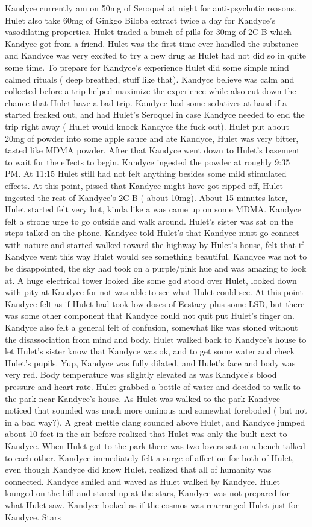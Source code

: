 \documentclass[12pt]{book}
\begin{document}
Kandyce currently am on 50mg of Seroquel at night for anti-psychotic reasons. Hulet also take 60mg of Ginkgo Biloba extract twice a day for Kandyce's vasodilating properties. Hulet traded a bunch of pills for 30mg of 2C-B which Kandyce got from a friend. Hulet was the first time ever handled the substance and Kandyce was very excited to try a new drug as Hulet had not did so in quite some time. To prepare for Kandyce's experience Hulet did some simple mind calmed rituals ( deep breathed, stuff like that). Kandyce believe was calm and collected before a trip helped maximize the experience while also cut down the chance that Hulet have a bad trip. Kandyce had some sedatives at hand if a started freaked out, and had Hulet's Seroquel in case Kandyce needed to end the trip right away ( Hulet would knock Kandyce the fuck out). Hulet put about 20mg of powder into some apple sauce and ate Kandyce, Hulet was very bitter, tasted like MDMA powder. After that Kandyce went down to Hulet's basement to wait for the effects to begin. Kandyce ingested the powder at roughly 9:35 PM. At 11:15 Hulet still had not felt anything besides some mild stimulated effects. At this point, pissed that Kandyce might have got ripped off, Hulet ingested the rest of Kandyce's 2C-B ( about 10mg). About 15 minutes later, Hulet started felt very hot, kinda like a was came up on some MDMA. Kandyce felt a strong urge to go outside and walk around. Hulet's sister was sat on the steps talked on the phone. Kandyce told Hulet's that Kandyce must go connect with nature and started walked toward the highway by Hulet's house, felt that if Kandyce went this way Hulet would see something beautiful. Kandyce was not to be disappointed, the sky had took on a purple/pink hue and was amazing to look at. A huge electrical tower looked like some god stood over Hulet, looked down with pity at Kandyce for not was able to see what Hulet could see. At this point Kandyce felt as if Hulet had took low doses of Ecstacy plus some LSD, but there was some other component that Kandyce could not quit put Hulet's finger on. Kandyce also felt a general felt of confusion, somewhat like was stoned without the disassociation from mind and body. Hulet walked back to Kandyce's house to let Hulet's sister know that Kandyce was ok, and to get some water and check Hulet's pupils. Yup, Kandyce was fully dilated, and Hulet's face and body was very red. Body temperature was slightly elevated as was Kandyce's blood pressure and heart rate. Hulet grabbed a bottle of water and decided to walk to the park near Kandyce's house. As Hulet was walked to the park Kandyce noticed that sounded was much more ominous and somewhat foreboded ( but not in a bad way?). A great mettle clang sounded above Hulet, and Kandyce jumped about 10 feet in the air before realized that Hulet was only the built next to Kandyce. When Hulet got to the park there was two lovers sat on a bench talked to each other. Kandyce immediately felt a surge of affection for both of Hulet, even though Kandyce did know Hulet, realized that all of humanity was connected. Kandyce smiled and waved as Hulet walked by Kandyce. Hulet lounged on the hill and stared up at the stars, Kandyce was not prepared for what Hulet saw. Kandyce looked as if the cosmos was rearranged Hulet just for Kandyce. Stars 
\end{document}
